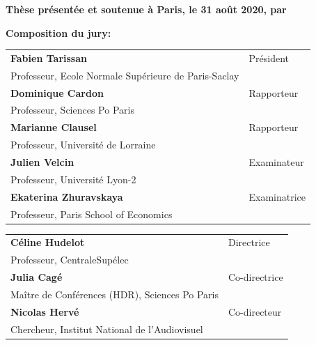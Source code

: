 \begin{titlepage}
\textbf{Thèse présentée et soutenue à Paris, le 31 août 2020, par}\\
\bigskip
\Large {\color{Prune} \textbf{\PhDname}}



\flushleft \small \textbf{Composition du jury:}
\bigskip



\scriptsize
\begin{tabular}{|p{8cm}l}
\arrayrulecolor{Prune}
\textbf{Fabien Tarissan} &   Président\\ 
Professeur,  Ecole Normale Supérieure de Paris-Saclay& \\
\textbf{Dominique Cardon} &  Rapporteur \\ 
Professeur, Sciences Po Paris &   \\ 
\textbf{Marianne Clausel} &  Rapporteur \\ 
Professeur, Université de Lorraine   &   \\ 
\textbf{Julien Velcin} &  Examinateur \\ 
Professeur, Université Lyon-2   &   \\ 
\textbf{Ekaterina Zhuravskaya} &  Examinatrice \\ 
Professeur, Paris School of Economics   &   \\ 
\end{tabular} 

\medskip
\begin{tabular}{|p{8cm}l}\arrayrulecolor{white}
\textbf{Céline Hudelot} &   Directrice\\ 
Professeur, CentraleSupélec  & \\
\textbf{Julia Cagé} &   Co-directrice\\ 
Maître de Conférences (HDR), Sciences Po Paris  &   \\ 
\textbf{Nicolas Hervé} & Co-directeur\\ 
Chercheur, Institut National de l'Audiovisuel  &   \\



\end{tabular} 


\end{titlepage}